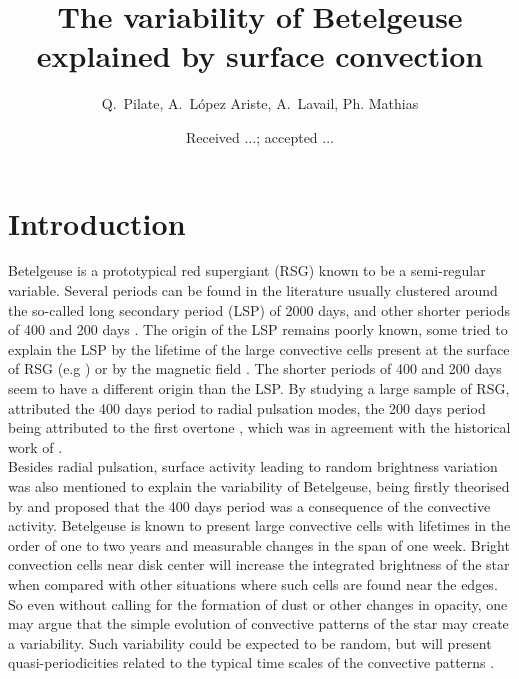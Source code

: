 \documentclass{aa}
\begin{document}
 


   \title{The variability  of Betelgeuse explained by surface convection}


    \author{{ Q.~Pilate},{ A.~L{\'o}pez Ariste},{ A.~Lavail},{ Ph. Mathias} }


   \date{Received ...; accepted ...}

 
  \abstract


   \keywords{
               }

   \maketitle
%

\section{Introduction}
Betelgeuse is a prototypical red supergiant (RSG) known to be a semi-regular variable. Several periods can be found in the 
literature usually clustered around the so-called long secondary period (LSP) of 2000 days, and other shorter periods of 400 and 200 days \citep{kiss_variability_2006}. The origin of the LSP remains poorly known, some tried to explain the LSP by the lifetime of the large convective cells present at the surface of RSG (e.g \cite{stothers_giant_2010}) or by the magnetic field \citep{wood_long_2004}. The shorter periods of 400 and 200 days seem to have a different origin than the LSP. By studying a large sample of RSG, \cite{kiss_variability_2006} attributed the 400 days period to radial pulsation modes, the 200 days period being attributed to the first overtone \citep{joyce_standing_2020}, which was in agreement with the historical work of \cite{stothers_pulsation_1969}.\\

Besides radial pulsation, surface activity leading to random brightness variation was also mentioned to explain the variability of Betelgeuse, being firstly theorised by \cite{schwarzschild_scale_1975} and \cite{gray_mass_2008} proposed that the 400 days period was a consequence of the convective activity. Betelgeuse is known to present large convective cells with lifetimes in the order of one to two years \citep{lopez_ariste_convective_2018} and measurable changes 
in the span of one week. Bright convection cells near disk center will increase the integrated brightness of the star when 
compared with other situations where such cells are found near the edges. So even without calling for the formation of 
dust or other changes in opacity, one may argue that the simple evolution of convective patterns of the star may create a variability. Such 
variability could be expected to be random, but will present quasi-periodicities related to the typical time scales of the 
convective patterns \citep{gray_mass_2008}. \\
\end{document}
